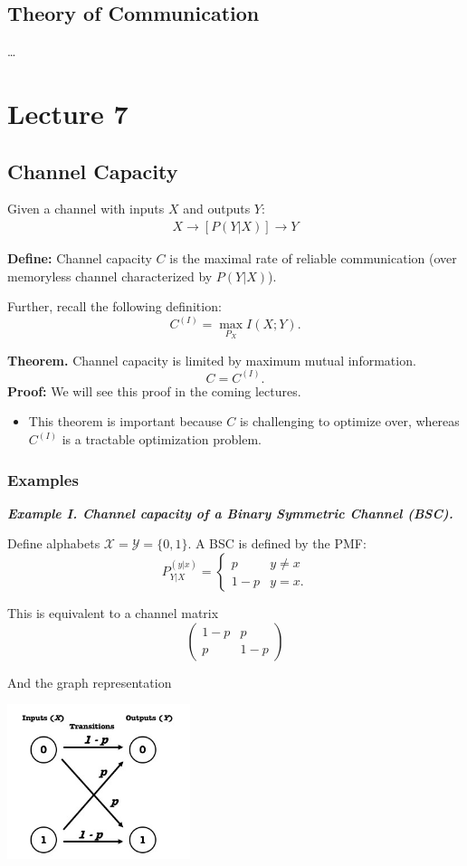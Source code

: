 \documentclass[13pt]{article}
\newcommand{\eq}[1]{\begin{align*}#1\end{align*}}
\begin{document}
\subsection{Theory of Communication}
\dots

\section{Lecture 7}

\subsection{Channel Capacity}

Given a channel with inputs $X$ and outputs $Y$:
\eq{X \to [P(Y|X)] \to Y}

\textbf{Define:} Channel capacity $C$ is the maximal rate of reliable communication (over memoryless channel characterized by $P(Y|X)$).

Further, recall the following definition:
\[
C^{(I)} = \max_{P_X} I(X; Y).
\]

{\bf Theorem.} Channel capacity is limited by maximum mutual information. 
\[
C = C^{(I)}.
\]
\textbf{Proof: } We will see this proof in the coming lectures.

\begin{itemize}
\item This theorem is important because $C$ is challenging to optimize over, whereas $C^{(I)}$ is a tractable optimization problem.
\end{itemize}

\subsubsection{Examples}
\textbf{\textit{Example I. Channel capacity of a Binary Symmetric Channel (BSC).}}

Define alphabets $\mathcal{X} = \mathcal{Y} = \{ 0, 1 \}$. A BSC is defined by the PMF:
\[
P_{Y|X}^{(y|x)} = \begin{cases}
p & y \neq x \\ 
1 - p & y = x.
\end{cases}
\]

This is equivalent to a channel matrix
\[
\begin{pmatrix}
1-p & p \\
p & 1 - p
\end{pmatrix}
\]

And the graph representation

\includegraphics[width=0.4\textwidth]{img/bsc.png}
\end{document}
